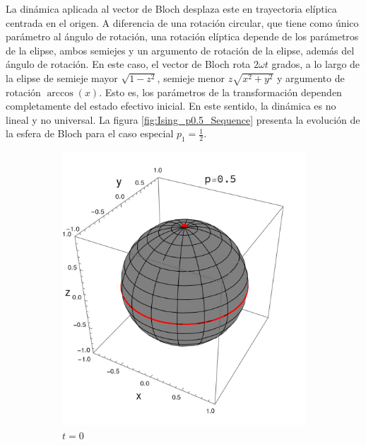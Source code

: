 La dinámica aplicada al vector de Bloch desplaza este en trayectoria elíptica centrada en el origen. A diferencia de una rotación circular, que tiene como único parámetro al ángulo de rotación, una rotación elíptica depende de los parámetros de la elipse, ambos semiejes y un argumento de rotación de la elipse, además del ángulo de rotación. En este caso, el vector de Bloch rota $2\omega t$ grados, a lo largo de la elipse de semieje mayor $\sqrt{1-z^2}$, semieje menor $z\sqrt{x^2+y^2}$ y argumento de rotación $\arccos(x)$. Esto es, los parámetros de la transformación dependen completamente del estado efectivo inicial. En este sentido, la dinámica es no lineal y no universal. La figura \ref{fig:Ising_p0.5_Sequence} presenta la evolución de la esfera de Bloch para el caso especial $p_{1}=\frac{1}{2}$.

\begin{figure}[ht!]
    \centering
    \begin{subfigure}{0.32\textwidth}
      \centering
      \includegraphics[width=0.9\linewidth]{chapter3/figures_special/sphere_Ising_t=0._z=0.9_p=0.5.png}
      \caption{$t=0$}
    \end{subfigure}%
    \begin{subfigure}{0.32\textwidth}
      \centering

\end{subfigure}
\end{figure}
